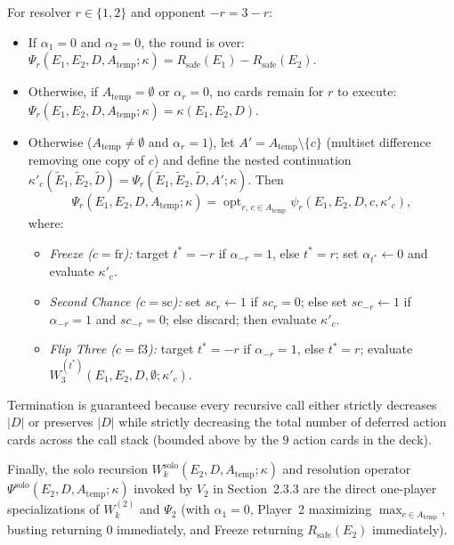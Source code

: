 \documentclass{article}
\theoremstyle{plain}
\theoremstyle{definition}
\theoremstyle{remark}
\begin{document}
For resolver $r \in \{1, 2\}$ and opponent $-r = 3 - r$:
\begin{itemize}
    \item If $\alpha_1 = 0$ and $\alpha_2 = 0$, the round is over: $\Psi_r(E_1, E_2, D, A_{\text{temp}}; \kappa) = R_{\text{safe}}(E_1) - R_{\text{safe}}(E_2)$.
    \item Otherwise, if $A_{\text{temp}} = \emptyset$ or $\alpha_r = 0$, no cards remain for $r$ to execute: $\Psi_r(E_1, E_2, D, A_{\text{temp}}; \kappa) = \kappa(E_1, E_2, D)$.
    \item Otherwise ($A_{\text{temp}} \neq \emptyset$ and $\alpha_r = 1$), let $A' = A_{\text{temp}} \setminus \{c\}$ (multiset difference removing one copy of $c$) and define the nested continuation $\kappa'_c(\tilde{E}_1, \tilde{E}_2, \tilde{D}) = \Psi_r(\tilde{E}_1, \tilde{E}_2, \tilde{D}, A'; \kappa)$. Then
    \[
        \Psi_r(E_1, E_2, D, A_{\text{temp}}; \kappa) = \operatorname{opt}_{r, \, c \in A_{\text{temp}}} \psi_r(E_1, E_2, D, c, \kappa'_c),
    \]
    where:
    \begin{itemize}
        \item \textit{Freeze ($c = \text{fr}$):} target $t^* = -r$ if $\alpha_{-r} = 1$, else $t^* = r$; set $\alpha_{t^*} \leftarrow 0$ and evaluate $\kappa'_c$.
        \item \textit{Second Chance ($c = \text{sc}$):} set $sc_r \leftarrow 1$ if $sc_r = 0$; else set $sc_{-r} \leftarrow 1$ if $\alpha_{-r} = 1$ and $sc_{-r} = 0$; else discard; then evaluate $\kappa'_c$.
        \item \textit{Flip Three ($c = \text{f3}$):} target $t^* = -r$ if $\alpha_{-r} = 1$, else $t^* = r$; evaluate $W_3^{(t^*)}(E_1, E_2, D, \emptyset; \kappa'_c)$.
    \end{itemize}
\end{itemize}
Termination is guaranteed because every recursive call either strictly decreases $|D|$ or preserves $|D|$ while strictly decreasing the total number of deferred action cards across the call stack (bounded above by the $9$ action cards in the deck).

Finally, the solo recursion $W_k^{\text{solo}}(E_2, D, A_{\text{temp}}; \kappa)$ and resolution operator $\Psi^{\text{solo}}(E_2, D, A_{\text{temp}}; \kappa)$ invoked by $V_2$ in Section~2.3.3 are the direct one-player specializations of $W_k^{(2)}$ and $\Psi_2$ (with $\alpha_1 = 0$, Player~2 maximizing $\max_{c \in A_{\text{temp}}}$, busting returning $0$ immediately, and Freeze returning $R_{\text{safe}}(E_2)$ immediately).
\end{document}
